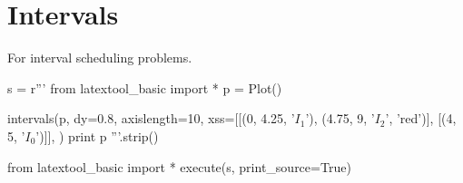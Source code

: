 \newpage
\section{Intervals}

For interval scheduling problems.

\begin{python}
s = r'''
from latextool_basic import *
p = Plot()

intervals(p,
          dy=0.8,
          axislength=10,
          xss=[[(0, 4.25, '$I_1$'), (4.75, 9, '$I_2$', 'red')],
               [(4, 5, '$I_0$')]],
         )
print p
'''.strip()

from latextool_basic import *
execute(s, print_source=True)
\end{python}


